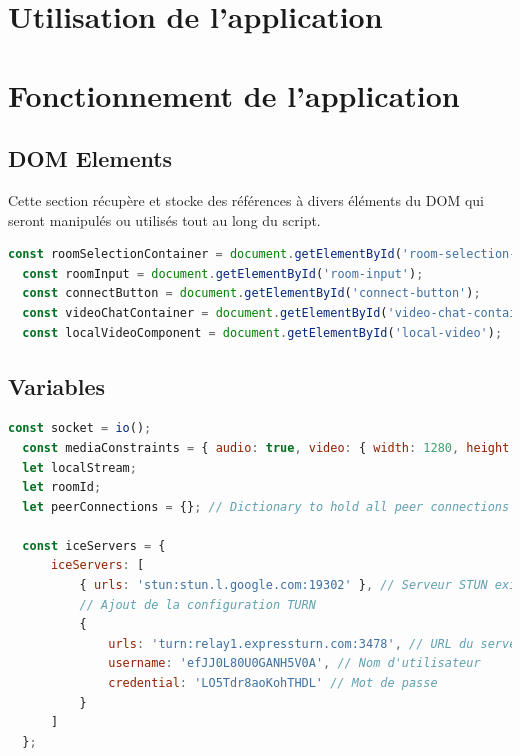 \documentclass[12pt, a4paper, oneside]{Thesis}
\begin{document}
\newpage

\section{Utilisation de l'application}

\newpage

\section{Fonctionnement de l'application}

\subsection{DOM Elements}

Cette section récupère et stocke des références à divers éléments du DOM qui seront manipulés ou utilisés tout au long du script.\\

\begin{lstlisting}[language=JavaScript, caption={DOM Elements}, label=DOM Elements]
  const roomSelectionContainer = document.getElementById('room-selection-container');
  const roomInput = document.getElementById('room-input');
  const connectButton = document.getElementById('connect-button');
  const videoChatContainer = document.getElementById('video-chat-container');
  const localVideoComponent = document.getElementById('local-video');
\end{lstlisting}

\newpage

\subsection{Variables}

\begin{lstlisting}[language=JavaScript, caption={Variables}, label=Variables]
  const socket = io();
  const mediaConstraints = { audio: true, video: { width: 1280, height: 720 } };
  let localStream;
  let roomId;
  let peerConnections = {}; // Dictionary to hold all peer connections
  
  const iceServers = {
      iceServers: [
          { urls: 'stun:stun.l.google.com:19302' }, // Serveur STUN existant
          // Ajout de la configuration TURN
          {
              urls: 'turn:relay1.expressturn.com:3478', // URL du serveur TURN
              username: 'efJJ0L80U0GANH5V0A', // Nom d'utilisateur
              credential: 'LO5Tdr8aoKohTHDL' // Mot de passe
          }
      ]
  };
\end{lstlisting}
\end{document}
